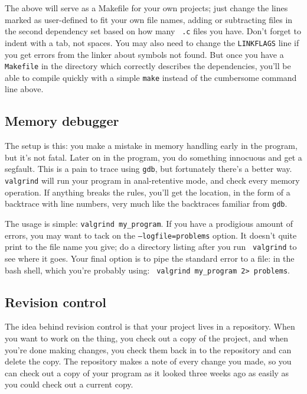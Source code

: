\documentclass[12pt]{article}
\begin{document}
The above will serve as a Makefile for your own projects; just change
the lines marked as user-defined to fit your own file names, adding or
subtracting files in the second dependency set based on how many {\tt
.c} files you have. Don't forget to indent with a tab, not spaces. You
may also need to change the {\tt LINKFLAGS} line if you get errors from
the linker about symbols not found. But once you have a {\tt Makefile}
in the directory which correctly describes the dependencies, you'll
be able to compile quickly with a simple {\tt make} instead of the
cumbersome command line above.

\subsection{Memory debugger}  
 \label{valgrind}

The setup is this: you make a mistake in memory handling early in the program, but
it's not fatal. Later on in the program, you do something innocuous and get a
segfault. This is a pain to trace using {\tt gdb}, but fortunately there's a
better way. {\tt valgrind} will run your program in anal-retentive mode, and check
every memory operation. If anything breaks the rules, you'll get the location, in
the form of a backtrace with line numbers, very much like the backtraces familiar
from {\tt gdb}.

The usage is simple: {\tt valgrind my\_program}. If you have a prodigious amount
of errors, you may want to tack on the {\tt --logfile=problems} option. It doesn't
quite print to the file name you give; do a directory listing after you run {\tt
valgrind} to see where it goes.  Your final option is to pipe the standard
error to a file: in the bash shell, which you're probably using: {\tt
valgrind my\_program 2> problems}.

\subsection{Revision control}  
The idea behind revision control is that your project lives in a
repository. When you want to work on the thing, you check out a copy
of the project, and when you're done making changes, you check them back
in to the repository and can delete the copy.  The repository makes a note
of every change you made, so you can check out a copy of your program as
it looked three weeks ago as easily as you could check out a current copy.
\end{document}
